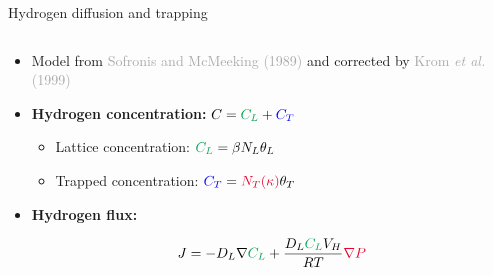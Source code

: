 \documentclass[9pt]{beamer}
\begin{document}
\begin{frame}{Hydrogen diffusion and trapping}

    \begin{columns}
    
        \begin{column}{0.8\textwidth}
    
            \begin{itemize}
                \item Model from \textcolor{darkgray}{Sofronis and McMeeking (1989)} and corrected by \textcolor{darkgray}{Krom \textit{et al.} (1999)}
                
                \vspace{0.35cm}
            
                \item \textbf{Hydrogen concentration:} \hspace{0.5cm} $ \displaystyle C = \textcolor{DarkGreen}{C_L} + \textcolor{blue}{C_T}$
    
                \begin{itemize}
                    \vspace{0.35cm}
                    \item Lattice concentration: \hspace{1.0cm} $\displaystyle \textcolor{DarkGreen}{C_L} = \beta N_L \theta_L$
                    
                    \vspace{0.35cm}
        
                    \item Trapped concentration: \hspace{0.8cm} $\displaystyle \textcolor{blue}{C_T} = \textcolor{NewRed}{N_T(\kappa)} \theta_T$
    
                \end{itemize}
    
                \vspace{0.35cm}
    
                \item \textbf{Hydrogen flux:}
    
                \begin{equation*}
                    J = -D_L \nabla \textcolor{DarkGreen}{C_L} + \frac{D_L \textcolor{DarkGreen}{C_L} V_H}{RT} \textcolor{NewRed}{\nabla P}
                \end{equation*}
            
                \vspace{0.1cm}
            

\end{itemize}
\end{column}
\end{columns}
\end{frame}
\end{document}
